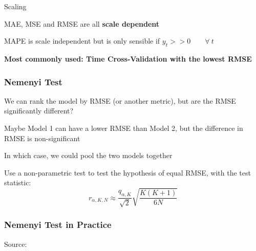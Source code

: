 \documentclass{beamer}
\newenvironment{wideitemize}{\itemize\addtolength{\itemsep}{10pt}}{\enditemize}
\begin{document}
\begin{frame}{Scaling}  
  \begin{wideitemize}
  \item MAE, MSE and RMSE are all \textbf{scale dependent}
  \item MAPE is scale independent but is only sensible if $y_t >> 0 \qquad \forall \ t$
  \item \textbf{Most commonly used: Time Cross-Validation with the lowest RMSE}
  \end{wideitemize}  
\end{frame}

    \begin{frame}
      \frametitle{Nemenyi Test}

      \begin{wideitemize}
        \item We can rank the model by RMSE (or another metric), but are the RMSE significantly different? 
        \item Maybe Model 1 can have a lower RMSE than Model 2, but the difference in RMSE is non-significant
        \item In which case, we could pool the two models together
        \item Use a non-parametric test to test the hypothesis of equal RMSE, with the test statistic:
          \begin{equation*}
            r_{\alpha, K, N} \approx \frac{q_{\alpha, K}}{\sqrt{2}} \sqrt{\frac{K (K+1)}{6N}}
          \end{equation*}
      \end{wideitemize}      
    \end{frame}

    \begin{frame}
      \frametitle{Nemenyi Test in Practice}
  \hspace*{15pt}\hbox{\scriptsize Source:}      
    \end{frame}
\end{document}
